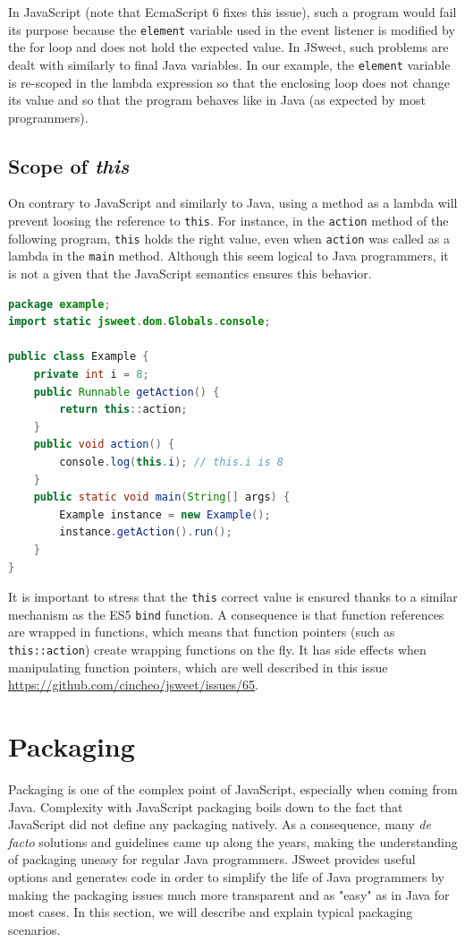 \documentclass[a4paper]{report}
\begin{document}
In JavaScript (note that EcmaScript 6 fixes this issue), such a program would fail its purpose because the \texttt{element} variable used in the event listener is modified by the for loop and does not hold the expected value. In JSweet, such problems are dealt with similarly to final Java variables. In our example, the \texttt{element} variable is re-scoped in the lambda expression so that the enclosing loop does not change its value and so that the program behaves like in Java (as expected by most programmers).

\section{Scope of \emph{this}}

On contrary to JavaScript and similarly to Java, using a method as a lambda will prevent loosing the reference to \texttt{this}. For instance, in the \texttt{action} method of the following program, \texttt{this} holds the right value, even when \texttt{action} was called as a lambda in the \texttt{main} method. Although this seem logical to Java programmers, it is not a given that the JavaScript semantics ensures this behavior. 

\begin{lstlisting}[language=Java]
package example;
import static jsweet.dom.Globals.console;

public class Example {
	private int i = 8;
	public Runnable getAction() {
		return this::action;
	}
	public void action() {
		console.log(this.i); // this.i is 8
	}
	public static void main(String[] args) {
		Example instance = new Example();
		instance.getAction().run();
	}
}
\end{lstlisting}

It is important to stress that the \texttt{this} correct value is ensured thanks to a similar mechanism as the ES5 \texttt{bind} function. A consequence is that 
function references are wrapped in functions, which means that function pointers (such as \texttt{this::action}) create wrapping functions on the fly. It has side effects when manipulating function pointers, which are well described in this issue \url{https://github.com/cincheo/jsweet/issues/65}.

\chapter{Packaging}
\label{packaging}

Packaging is one of the complex point of JavaScript, especially when coming from Java. Complexity with JavaScript packaging boils down to the fact that JavaScript did not define any packaging natively. As a consequence, many \emph{de facto} solutions and guidelines came up along the years, making the understanding of packaging uneasy for regular Java programmers. JSweet provides useful options and generates code in order to simplify the life of Java programmers by making the packaging issues much more transparent and as "easy" as in Java for most cases. In this section, we will describe and explain typical packaging scenarios.
\end{document}
